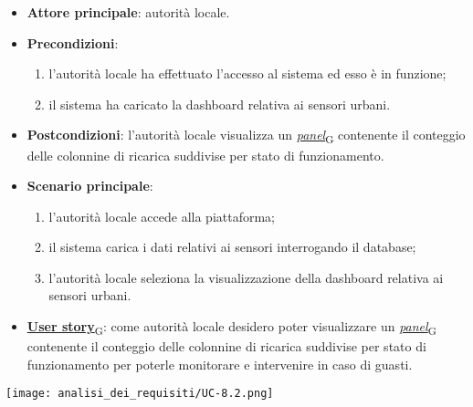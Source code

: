 \begin{itemize}
	\item \textbf{Attore principale}: autorità locale.
	\item \textbf{Precondizioni}:
	      \begin{enumerate}
		      \item l'autorità locale ha effettuato l'accesso al sistema ed esso è in funzione;
		      \item il sistema ha caricato la dashboard relativa ai sensori urbani.
	      \end{enumerate}
	\item \textbf{Postcondizioni}: l'autorità locale visualizza un \href{https://7last.github.io/docs/pb/documentazione-interna/glossario\#panel}{\textit{panel}\textsubscript{G}} contenente il conteggio delle colonnine di ricarica suddivise per stato di funzionamento.
	\item \textbf{Scenario principale}:
	      \begin{enumerate}
		      \item l'autorità locale accede alla piattaforma;
		      \item il sistema carica i dati relativi ai sensori interrogando il database;
		      \item l'autorità locale seleziona la visualizzazione della dashboard relativa ai sensori urbani.
	      \end{enumerate}
	\item \href{https://7last.github.io/docs/pb/documentazione-interna/glossario\#user-story}{\textbf{User story}\textsubscript{G}}:
	      come autorità locale desidero poter visualizzare un \href{https://7last.github.io/docs/pb/documentazione-interna/glossario\#panel}{\textit{panel}\textsubscript{G}} contenente il conteggio delle colonnine di ricarica suddivise per stato di funzionamento
	      per poterle monitorare e intervenire in caso di guasti.
\end{itemize}
\begin{center}
	\texttt{[image: analisi\_dei\_requisiti/UC-8.2.png]}
\end{center}

